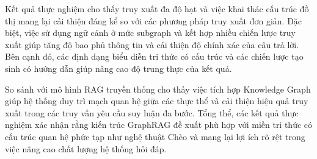 Kết quả thực nghiệm cho thấy truy xuất đa độ hạt và việc khai thác cấu trúc đồ thị mang lại cải thiện đáng kể so với các phương pháp truy xuất đơn giản. Đặc biệt, việc sử dụng ngữ cảnh ở mức subgraph và kết hợp nhiều chiến lược truy xuất giúp tăng độ bao phủ thông tin và cải thiện độ chính xác của câu trả lời. Bên cạnh đó, các định dạng biểu diễn tri thức có cấu trúc và các chiến lược tạo sinh có hướng dẫn giúp nâng cao độ trung thực của kết quả.

So sánh với mô hình RAG truyền thống cho thấy việc tích hợp Knowledge Graph giúp hệ thống duy trì mạch quan hệ giữa các thực thể và cải thiện hiệu quả truy xuất trong các truy vấn yêu cầu suy luận đa bước. Tổng thể, các kết quả thực nghiệm xác nhận rằng kiến trúc GraphRAG đề xuất phù hợp với miền tri thức có cấu trúc quan hệ phức tạp như nghệ thuật Chèo và mang lại lợi ích rõ rệt trong việc nâng cao chất lượng hệ thống hỏi đáp.